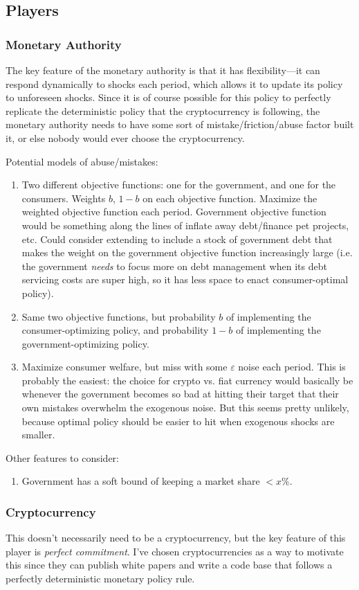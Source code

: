 \documentclass[dvipsnames]{article}
\begin{document}
\subsection{Players}
\subsubsection{Monetary Authority}
The key feature of the monetary authority is that it has flexibility---it can respond dynamically to shocks each period, which allows it to update its policy to unforeseen shocks. Since it is of course possible for this policy to perfectly replicate the deterministic policy that the cryptocurrency is following, the monetary authority needs to have some sort of mistake/friction/abuse factor built it, or else nobody would ever choose the cryptocurrency.


Potential models of abuse/mistakes:
\begin{enumerate}
\item Two different objective functions: one for the government, and one for the consumers. Weights $b$, $1 - b$ on each objective function. Maximize the weighted objective function each period. Government objective function would be something along the lines of inflate away debt/finance pet projects, etc. Could consider extending to include a stock of government debt that makes the weight on the government objective function increasingly large (i.e. the government \emph{needs} to focus more on debt management when its debt servicing costs are super high, so it has less space to enact consumer-optimal policy).
\item Same two objective functions, but probability $b$ of implementing the consumer-optimizing policy, and probability $1 - b$ of implementing the government-optimizing policy.
  \item Maximize consumer welfare, but miss with some $\varepsilon$ noise each period. This is probably the easiest: the choice for crypto vs. fiat currency would basically be whenever the government becomes so bad at hitting their target that their own mistakes overwhelm the exogenous noise. But this seems pretty unlikely, because optimal policy should be easier to hit when exogenous shocks are smaller.
\end{enumerate}
Other features to consider:
\begin{enumerate}
\item Government has a soft bound of keeping a market share $<x\%$.
\end{enumerate}
\subsubsection{Cryptocurrency}
This doesn't necessarily need to be a cryptocurrency, but the key feature of this player is \emph{perfect commitment}. I've chosen cryptocurrencies as a way to motivate this since they can publish white papers and write a code base that follows a perfectly deterministic monetary policy rule.
\end{document}
